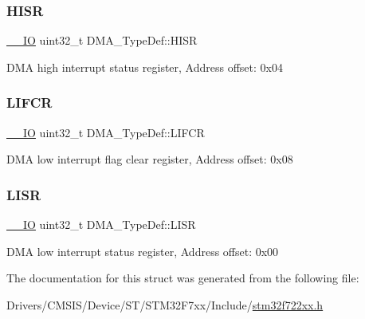 \subsubsection{\texorpdfstring{HISR}{HISR}}
{\footnotesize\ttfamily \mbox{\hyperlink{core__sc300_8h_aec43007d9998a0a0e01faede4133d6be}{\+\_\+\+\_\+\+IO}} uint32\+\_\+t D\+M\+A\+\_\+\+Type\+Def\+::\+H\+I\+SR}

D\+MA high interrupt status register, Address offset\+: 0x04 \mbox{\label{struct_d_m_a___type_def_a11adb689c874d38b49fa44990323b653}} 
\subsubsection{\texorpdfstring{LIFCR}{LIFCR}}
{\footnotesize\ttfamily \mbox{\hyperlink{core__sc300_8h_aec43007d9998a0a0e01faede4133d6be}{\+\_\+\+\_\+\+IO}} uint32\+\_\+t D\+M\+A\+\_\+\+Type\+Def\+::\+L\+I\+F\+CR}

D\+MA low interrupt flag clear register, Address offset\+: 0x08 \mbox{\label{struct_d_m_a___type_def_aacb4a0977d281bc809cb5974e178bc2b}} 
\subsubsection{\texorpdfstring{LISR}{LISR}}
{\footnotesize\ttfamily \mbox{\hyperlink{core__sc300_8h_aec43007d9998a0a0e01faede4133d6be}{\+\_\+\+\_\+\+IO}} uint32\+\_\+t D\+M\+A\+\_\+\+Type\+Def\+::\+L\+I\+SR}

D\+MA low interrupt status register, Address offset\+: 0x00 

The documentation for this struct was generated from the following file\+:\begin{DoxyCompactItemize}
\item 
Drivers/\+C\+M\+S\+I\+S/\+Device/\+S\+T/\+S\+T\+M32\+F7xx/\+Include/\mbox{\hyperlink{stm32f722xx_8h}{stm32f722xx.\+h}}\end{DoxyCompactItemize}
